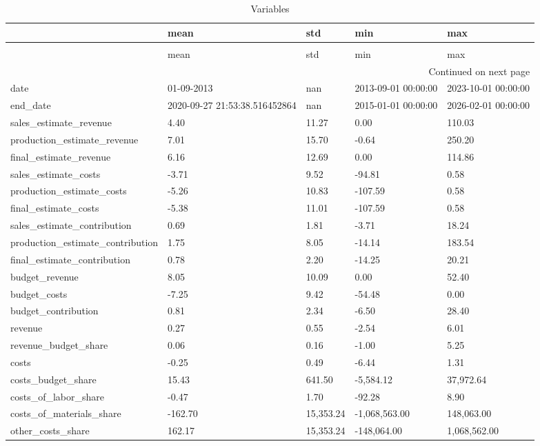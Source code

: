 \begin{longtable}{lllll}
\caption{Variables} \label{eda_1} \\
\toprule
 & mean & std & min & max \\
\midrule
\endfirsthead
\caption[]{Variables} \\
\toprule
 & mean & std & min & max \\
\midrule
\endhead
\midrule
\multicolumn{5}{r}{Continued on next page} \\
\midrule
\endfoot
\bottomrule
\endlastfoot
date & 01-09-2013 & nan & 2013-09-01 00:00:00 & 2023-10-01 00:00:00 \\
end_date & 2020-09-27 21:53:38.516452864 & nan & 2015-01-01 00:00:00 & 2026-02-01 00:00:00 \\
sales_estimate_revenue & 4.40 & 11.27 & 0.00 & 110.03 \\
production_estimate_revenue & 7.01 & 15.70 & -0.64 & 250.20 \\
final_estimate_revenue & 6.16 & 12.69 & 0.00 & 114.86 \\
sales_estimate_costs & -3.71 & 9.52 & -94.81 & 0.58 \\
production_estimate_costs & -5.26 & 10.83 & -107.59 & 0.58 \\
final_estimate_costs & -5.38 & 11.01 & -107.59 & 0.58 \\
sales_estimate_contribution & 0.69 & 1.81 & -3.71 & 18.24 \\
production_estimate_contribution & 1.75 & 8.05 & -14.14 & 183.54 \\
final_estimate_contribution & 0.78 & 2.20 & -14.25 & 20.21 \\
budget_revenue & 8.05 & 10.09 & 0.00 & 52.40 \\
budget_costs & -7.25 & 9.42 & -54.48 & 0.00 \\
budget_contribution & 0.81 & 2.34 & -6.50 & 28.40 \\
revenue & 0.27 & 0.55 & -2.54 & 6.01 \\
revenue_budget_share & 0.06 & 0.16 & -1.00 & 5.25 \\
costs & -0.25 & 0.49 & -6.44 & 1.31 \\
costs_budget_share & 15.43 & 641.50 & -5,584.12 & 37,972.64 \\
costs_of_labor_share & -0.47 & 1.70 & -92.28 & 8.90 \\
costs_of_materials_share & -162.70 & 15,353.24 & -1,068,563.00 & 148,063.00 \\
other_costs_share & 162.17 & 15,353.24 & -148,064.00 & 1,068,562.00 \\

\end{longtable}
